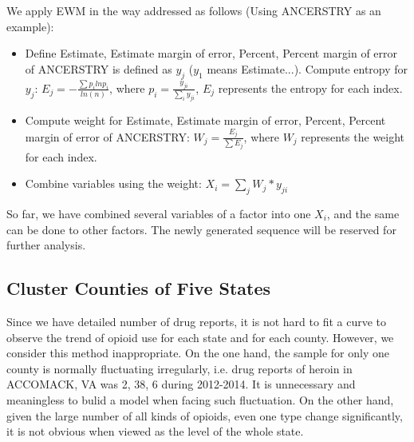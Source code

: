 \documentclass[12pt]{article}
\begin{document}
We apply EWM in the way addressed as follows (Using ANCERSTRY as an example):
\begin{itemize}
	\item Define Estimate, Estimate margin of error, Percent, Percent margin of error of ANCERSTRY is defined as $y_{j}$ ($y_{1}$ means Estimate...). Compute entropy for $y_{j}$: $ E_{j} = -\frac{\sum p_{i}lnp_{i}}{ln(n)}$, where $p_{i}=\frac{y_{ji}}{\sum_{i} y_{ji}}$, $E_{j}$ represents the entropy for each index.
	\item Compute weight for Estimate, Estimate margin of error, Percent, Percent margin of error of ANCERSTRY: $ W_{j} = \frac{E_{j}}{\sum E_{j}}$, where $W_{j}$ represents the weight for each index.
	\item Combine variables using the weight: $X_{i} = \sum_{j} W_{j} * y_{ji}$
\end{itemize}
So far, we have combined several variables of a factor into one $X_{i}$, and the same can be done to other factors. The newly generated sequence will be reserved for further analysis.

\subsection{Cluster Counties of Five States}
Since we have detailed number of drug reports, it is not hard to fit a curve to observe the trend of opioid use for each state and for each county. However, we consider this method inappropriate. On the one hand, the sample for only one county is normally fluctuating irregularly, i.e. drug reports of heroin in ACCOMACK, VA was 2, 38, 6 during 2012-2014. It is unnecessary and meaningless to bulid a model when facing such fluctuation. On the other hand, given the large number of all kinds of opioids, even one type change significantly, it is not obvious when viewed as the level of the whole state.
\end{document}
